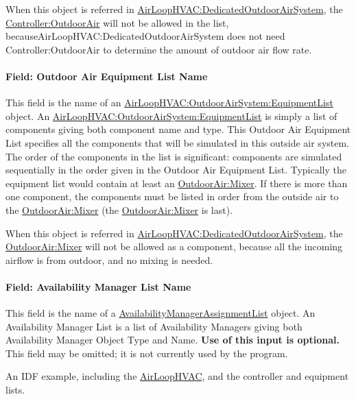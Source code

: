 When this object is referred in \hyperref[airloophvacdedicatedoutdoorairsystem]{AirLoopHVAC:DedicatedOutdoorAirSystem}, the \hyperref[controlleroutdoorair]{Controller:OutdoorAir} will not be allowed in the list, becauseAirLoopHVAC:DedicatedOutdoorAirSystem does not need Controller:OutdoorAir to determine the amount of outdoor air flow rate. 

\paragraph{Field: Outdoor Air Equipment List Name}\label{field-outdoor-air-equipment-list-name}

This field is the name of an \hyperref[airloophvacoutdoorairsystemequipmentlist]{AirLoopHVAC:OutdoorAirSystem:EquipmentList} object. An \hyperref[airloophvacoutdoorairsystemequipmentlist]{AirLoopHVAC:OutdoorAirSystem:EquipmentList} is simply a list of components giving both component name and type. This Outdoor Air Equipment List specifies all the components that will be simulated in this outside air system. The order of the components in the list is significant: components are simulated sequentially in the order given in the Outdoor Air Equipment List. Typically the equipment list would contain at least an \hyperref[outdoorairmixer]{OutdoorAir:Mixer}. If there is more than one component, the components must be listed in order from the outside air to the \hyperref[outdoorairmixer]{OutdoorAir:Mixer} (the \hyperref[outdoorairmixer]{OutdoorAir:Mixer} is last).

When this object is referred in \hyperref[airloophvacdedicatedoutdoorairsystem]{AirLoopHVAC:DedicatedOutdoorAirSystem}, the \hyperref[outdoorairmixer]{OutdoorAir:Mixer} will not be allowed as a component, because all the incoming airflow is from outdoor, and no mixing is needed. 

\paragraph{Field: Availability Manager List Name}\label{field-availability-manager-list-name-1}

This field is the name of a \hyperref[availabilitymanagerassignmentlist]{AvailabilityManagerAssignmentList} object. An Availability Manager List is a list of Availability Managers giving both Availability Manager Object Type and Name. \textbf{Use of this input is optional.} This field may be omitted; it is not currently used by the program.

An IDF example, including the \hyperref[airloophvac]{AirLoopHVAC}, and the controller and equipment lists.

